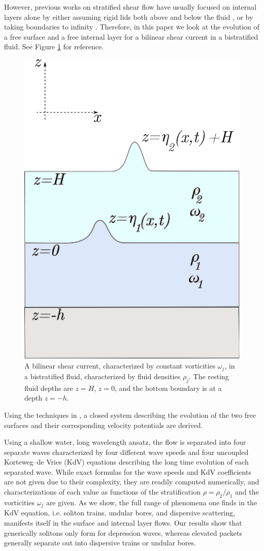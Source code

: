 \documentclass[a4paper,11pt]{article}
\begin{document}
However, previous works on stratified shear flow have usually focused on internal layers alone by either assuming rigid lids both above and below the fluid \cite{pullin2,pullin4,milewski,pullin3}, or by taking boundaries to infinity \cite{maslowe}.  Therefore, in this paper we look at the evolution of a free surface and a free internal layer for a bilinear shear current in a bistratified fluid.  See Figure \ref{fig:surface} for reference.  
\begin{figure}[t]
\centering
\includegraphics[width=.4\textwidth]{surface_wave}
\caption{A bilinear shear current, characterized by constant vorticities $\omega_{j}$, in a bistratified fluid, characterized by fluid densities $\rho_{j}$.  The resting fluid depths are $z=H$, $z=0$, and the bottom boundary is at a depth $z=-h$.}
\label{fig:surface}
\end{figure}
Using the techniques in \cite{ashton,haut}, a closed system describing the evolution of the two free surfaces and their corresponding velocity potentials are derived.  

Using a shallow water, long wavelength ansatz, the flow is separated into four separate waves characterized by four different wave speeds and four uncoupled Korteweg--de Vries (KdV) equations describing the long time evolution of each separated wave.  While exact formulas for the wave speeds and KdV coefficients are not given due to their complexity, they are readily computed numerically, and characterizations of each value as functions of the stratification $\rho = \rho_{2}/\rho_{1}$ and the vorticities $\omega_{j}$ are given.  As we show, the full range of phenomena one finds in the KdV equation, i.e. soliton trains, undular bores, and dispersive scattering, manifests itself in the surface and internal layer flows.  Our results show that generically solitons only form for depression waves, whereas elevated packets generally separate out into dispersive trains or undular bores.
\end{document}
